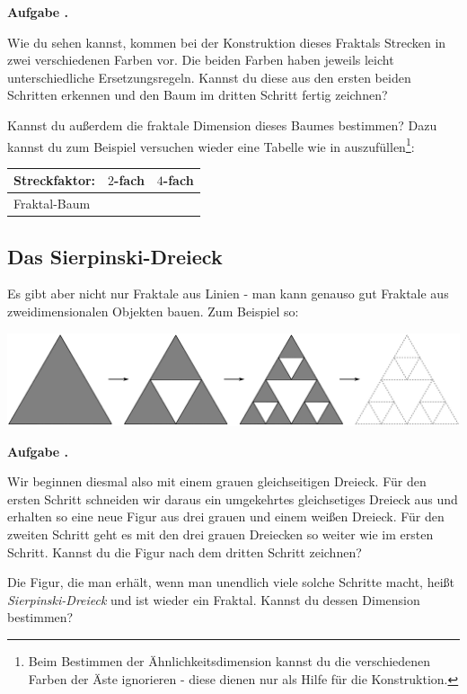 \documentclass[a4paper,ngerman,12pt]{scrartcl}
\theoremstyle{definition}
\theoremstyle{plain}
\theoremstyle{remark}
\newlength{\aufgabenskip}
\newcounter{aufgabennummer}
\newenvironment{aufgabe}[1]{
  \addtocounter{aufgabennummer}{1}
  \textbf{Aufgabe \theaufgabennummer.} \emph{#1} \par
}{\vspace{\aufgabenskip}}
\begin{document}
\begin{aufgabe}{}
	Wie du sehen kannst, kommen bei der Konstruktion dieses Fraktals Strecken in zwei verschiedenen Farben vor. Die beiden Farben haben jeweils leicht unterschiedliche Ersetzungsregeln. Kannst du diese aus den ersten beiden Schritten erkennen und den Baum im dritten Schritt fertig zeichnen? 
	
	Kannst du außerdem die fraktale Dimension dieses Baumes bestimmen? Dazu kannst du zum Beispiel versuchen wieder eine Tabelle wie in  auszufüllen\footnote{Beim Bestimmen der Ähnlichkeitsdimension kannst du die verschiedenen Farben der Äste ignorieren - diese dienen nur als Hilfe für die Konstruktion.}:
	\begin{center}
		\renewcommand{\arraystretch}{2}
		\begin{tabular}{l||c|c}
			Streckfaktor:& $2$-fach & $4$-fach \\\hline\hline
			Fraktal-Baum & 	&  \\	
		\end{tabular}
	\end{center}
\end{aufgabe}


\subsection{Das Sierpinski-Dreieck}

Es gibt aber nicht nur Fraktale aus Linien - man kann genauso gut Fraktale aus zweidimensionalen Objekten bauen. Zum Beispiel so:
\begin{center}
	\includegraphics[width=.7\textwidth]{Bilder/Sierpinski-Konstruktion.pdf}
\end{center}

\begin{aufgabe}{}\label{aufgabe:Sierpinski-Flaeche}
	Wir beginnen diesmal also mit einem grauen gleichseitigen Dreieck. Für den ersten Schritt schneiden wir daraus ein umgekehrtes gleichsetiges Dreieck aus und erhalten so eine neue Figur aus drei grauen und einem weißen Dreieck. Für den zweiten Schritt geht es mit den drei grauen Dreiecken so weiter wie im ersten Schritt. Kannst du die Figur nach dem dritten Schritt zeichnen?
	
	Die Figur, die man erhält, wenn man unendlich viele solche Schritte macht, heißt \emph{Sierpinski-Dreieck} und ist wieder ein Fraktal. Kannst du dessen Dimension bestimmen?
\end{aufgabe}
\end{document}
